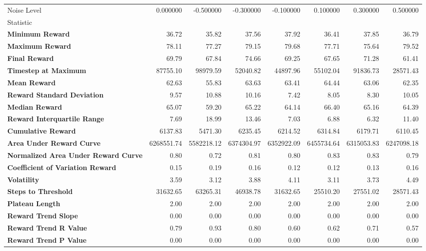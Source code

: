 \begin{tabular}{lrrrrrrr}
\toprule
Noise Level & 0.000000 & -0.500000 & -0.300000 & -0.100000 & 0.100000 & 0.300000 & 0.500000 \\
Statistic &  &  &  &  &  &  &  \\
\midrule
\textbf{Minimum Reward} & 36.72 & 35.82 & 37.56 & 37.92 & 36.41 & 37.85 & 36.79 \\
\textbf{Maximum Reward} & 78.11 & 77.27 & 79.15 & 79.68 & 77.71 & 75.64 & 79.52 \\
\textbf{Final Reward} & 69.79 & 67.84 & 74.66 & 69.25 & 67.65 & 71.28 & 61.41 \\
\textbf{Timestep at Maximum} & 87755.10 & 98979.59 & 52040.82 & 44897.96 & 55102.04 & 91836.73 & 28571.43 \\
\textbf{Mean Reward} & 62.63 & 55.83 & 63.63 & 63.41 & 64.44 & 63.06 & 62.35 \\
\textbf{Reward Standard Deviation} & 9.57 & 10.88 & 10.16 & 7.42 & 8.05 & 8.30 & 10.05 \\
\textbf{Median Reward} & 65.07 & 59.20 & 65.22 & 64.14 & 66.40 & 65.16 & 64.39 \\
\textbf{Reward Interquartile Range} & 7.69 & 18.99 & 13.46 & 7.03 & 6.88 & 6.32 & 11.40 \\
\textbf{Cumulative Reward} & 6137.83 & 5471.30 & 6235.45 & 6214.52 & 6314.84 & 6179.71 & 6110.45 \\
\textbf{Area Under Reward Curve} & 6268551.74 & 5582218.12 & 6374304.97 & 6352922.09 & 6455734.64 & 6315053.83 & 6247098.18 \\
\textbf{Normalized Area Under Reward Curve} & 0.80 & 0.72 & 0.81 & 0.80 & 0.83 & 0.83 & 0.79 \\
\textbf{Coefficient of Variation Reward} & 0.15 & 0.19 & 0.16 & 0.12 & 0.12 & 0.13 & 0.16 \\
\textbf{Volatility} & 3.59 & 3.12 & 3.88 & 4.11 & 3.11 & 3.73 & 4.49 \\
\textbf{Steps to Threshold} & 31632.65 & 63265.31 & 46938.78 & 31632.65 & 25510.20 & 27551.02 & 28571.43 \\
\textbf{Plateau Length} & 2.00 & 2.00 & 2.00 & 2.00 & 2.00 & 2.00 & 2.00 \\
\textbf{Reward Trend Slope} & 0.00 & 0.00 & 0.00 & 0.00 & 0.00 & 0.00 & 0.00 \\
\textbf{Reward Trend R Value} & 0.79 & 0.93 & 0.80 & 0.60 & 0.62 & 0.71 & 0.57 \\
\textbf{Reward Trend P Value} & 0.00 & 0.00 & 0.00 & 0.00 & 0.00 & 0.00 & 0.00 \\

\end{tabular}
